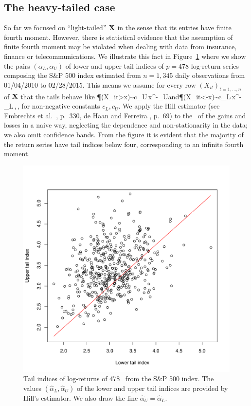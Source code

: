 \subsection{The heavy-tailed case}\label{subsec:1.2}
So far we focused on ``light-tailed'' ${\mathbf X}$
in the sense that its entries have finite fourth moment.  However, there is statistical evidence that the assumption
of finite fourth moment may be violated when dealing with data from
insurance, finance or telecommunications. We illustrate this fact
in Figure~\ref{fig:SP500_tail_indices} where we show the pairs $(\alpha_L,\alpha_U)$ of
lower and upper tail indices
of $p=478$  log-return series composing
the S\&P 500 index estimated from $n=1,345$ daily observations from 01/04/2010 to 02/28/2015.
This means we assume for every row  $(X_{it})_{t=1,\ldots,n}$ of ${\mathbf X}$ that the tails behave like
\beao
\P(X_{it}>x)\sim c_U\,x^{-\alpha_U}\qquad\mbox{and}\qquad \P(X_{it}<-x)\sim c_L\,x^{-\alpha_L}\,,\qquad \xto\,,
\eeao
for non-negative constants $c_L,c_U$. We apply the Hill estimator (see Embrechts et al.~\cite{embrechts:klueppelberg:mikosch:1997}, p.~330,
de Haan and Ferreira \cite{dehaan:ferreira:2006}, p.~69)
to the \ts\ of the gains and losses in a naive way,
neglecting the dependence and non-stationarity in the data; we also omit confidence bands.
From the figure it is evident that the majority of the return series have tail indices below
four, corresponding to an infinite fourth moment.
\begin{figure}[htb!]
\centering
\includegraphics[scale=0.5]{SP500_tail_indices.pdf}
\caption{Tail indices of log-returns of 478 \ts\ from the S\&P 500 index. The values  $(\hat \alpha_L,\hat \alpha_U)$ of the
lower and upper tail indices are provided by
Hill's estimator.  We also draw the line $\hat\alpha_U=\hat\alpha_L$.}
\label{fig:SP500_tail_indices}
\end{figure}
